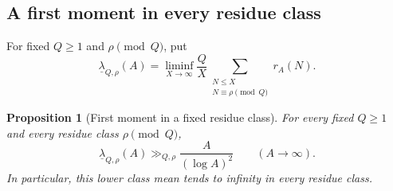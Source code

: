 \documentclass[11pt]{article}
\newtheorem{proposition}[theorem]{Proposition}
\theoremstyle{remark}
\newcommand{\N}{\mathbb N}
\newcommand{\1}{\mathbf 1}
\begin{document}
\subsection{A first moment in every residue class}

For fixed $Q\geq1$ and $\rho\pmod Q$, put
\[
 \underline\lambda_{Q,\rho}(A)
 =\liminf_{X\to\infty}\frac QX
 \sum_{\substack{N\leq X\\N\equiv\rho\pmod Q}}r_A(N).
\]

\begin{proposition}[First moment in a fixed residue class]
\label{prop:class-first-moment}
For every fixed $Q\geq1$ and every residue class $\rho\pmod Q$,
\[
 \underline\lambda_{Q,\rho}(A)
 \gg_{Q,\rho}\frac{A}{(\log A)^2}
 \qquad(A\to\infty).
\]
In particular, this lower class mean tends to infinity in every residue
class.
\end{proposition}
\end{document}
